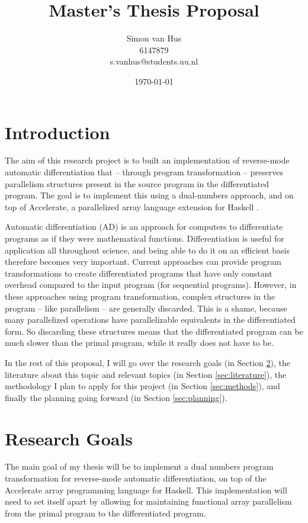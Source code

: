 \documentclass{article}
\title{Master's Thesis Proposal}
\author{Simon van Hus\\6147879\\s.vanhus@students.uu.nl}
\date{\today}
\begin{document}
    \maketitle

    \section{Introduction} \label{sec:introduction}
        The aim of this research project is to built an implementation of reverse-mode automatic differentiation that -- through program transformation -- preserves parallelism structures present in the source program in the differentiated program.
        The goal is to implement this using a dual-numbers approach, and on top of Accelerate, a parallelized array language extension for Haskell \cite{haskell}.

        Automatic differentiation (AD) is an approach for computers to differentiate programs as if they were mathematical functions.
        Differentiation is useful for application all throughout science, and being able to do it on an efficient basis therefore becomes very important.
        Current approaches can provide program transformations to create differentiated programs that have only constant overhead compared to the input program (for sequential programs).
        However, in these approaches using program transformation, complex structures in the program -- like parallelism -- are generally discarded.
        This is a shame, because many parallelized operations have parallelizable equivalents in the differentiated form.
        So discarding these structures means that the differentiated program can be much slower than the primal program, while it really does not have to be.

        In the rest of this proposal, I will go over the research goals (in Section \ref{sec:goals}), the literature about this topic and relevant topics (in Section \ref{sec:literature}), the methodology I plan to apply for this project (in Section \ref{sec:methods}), and finally the planning going forward (in Section \ref{sec:planning}).

    \section{Research Goals} \label{sec:goals}
        The main goal of my thesis will be to implement a dual numbers program transformation for reverse-mode automatic differentiation, on top of the Accelerate array programming language for Haskell.
        This implementation will need to set itself apart by allowing for maintaining functional array parallelism from the primal program to the differentiated program.
\end{document}
